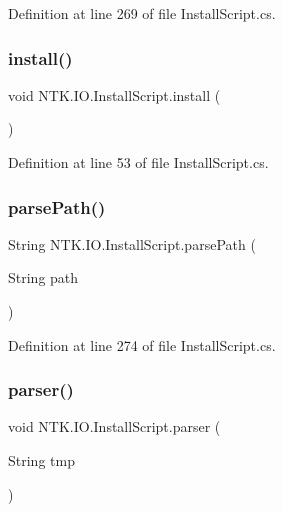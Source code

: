 Definition at line 269 of file Install\+Script.\+cs.

\mbox{\label{class_n_t_k_1_1_i_o_1_1_install_script_a9be428a95b4e00ef064e44c40adfc9d6}} 
\subsubsection{\texorpdfstring{install()}{install()}}
{\footnotesize\ttfamily void N\+T\+K.\+I\+O.\+Install\+Script.\+install (\begin{DoxyParamCaption}{ }\end{DoxyParamCaption})}



Definition at line 53 of file Install\+Script.\+cs.

\mbox{\label{class_n_t_k_1_1_i_o_1_1_install_script_a98769cc4b2984c43f01ec360dc7c8a25}} 
\subsubsection{\texorpdfstring{parsePath()}{parsePath()}}
{\footnotesize\ttfamily String N\+T\+K.\+I\+O.\+Install\+Script.\+parse\+Path (\begin{DoxyParamCaption}\item[{String}]{path }\end{DoxyParamCaption})}



Definition at line 274 of file Install\+Script.\+cs.

\mbox{\label{class_n_t_k_1_1_i_o_1_1_install_script_afce993acab2391c4bd766d47adbc116d}} 
\subsubsection{\texorpdfstring{parser()}{parser()}}
{\footnotesize\ttfamily void N\+T\+K.\+I\+O.\+Install\+Script.\+parser (\begin{DoxyParamCaption}\item[{String}]{tmp }\end{DoxyParamCaption})}



